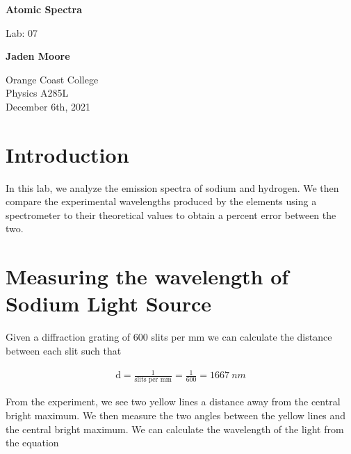 \documentclass[12pt]{article}
\begin{document}

\begin{titlepage}
    \begin{center}
        \vspace*{1cm}
        \textbf{Atomic Spectra}

        \vspace{0.5cm}
        Lab: 07

        \vspace{1cm}

        \textbf{Jaden Moore}

        \vfill

        Orange Coast College\\
        Physics A285L\\
        December 6th, 2021

    \end{center}
\end{titlepage}

\pagestyle{fancy}
\fancyhf{}
\setlength{\headheight}{15pt}
\cfoot{\thepage}

\section{Introduction}
In this lab, we analyze the emission spectra of sodium and hydrogen. We then compare the experimental wavelengths produced by the elements using a spectrometer to their theoretical values to obtain a percent error between the two.

\section{Measuring the wavelength of Sodium Light Source}
Given a diffraction grating of 600 slits per mm we can calculate the distance between each slit such that

\begin{equation}
    \begin{split}
        \text{d} = \frac{1}{\text{slits per mm}} = \frac{1}{600} = \SI{1667}{nm}
    \end{split}
\end{equation}

From the experiment, we see two yellow lines a distance away from the central bright maximum. We then measure the two angles between the yellow lines and the central bright maximum. We can calculate the wavelength of the light from the equation
\end{document}
